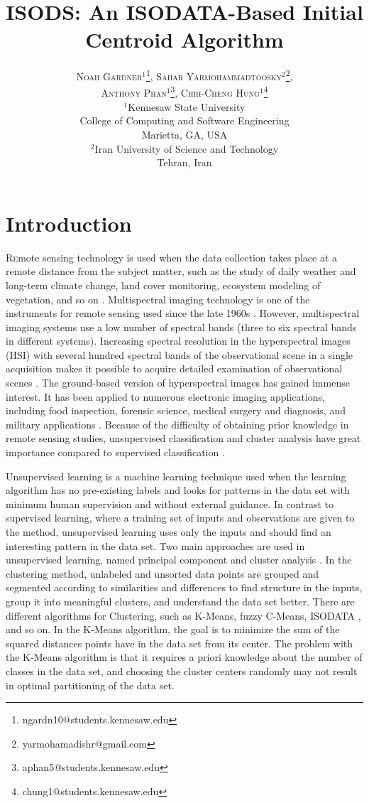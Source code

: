 \documentclass[twoside,twocolumn]{article}
\title{ISODS: An ISODATA-Based Initial Centroid Algorithm} %
\author{%
  \textsc{
    Noah Gardner$^1$\thanks{ngardn10@students.kennesaw.edu}, 
    Sahar Yarmohammadtoosky$^2$\thanks{yarmohamadishr@gmail.com},
    }\\[1ex]
  \textsc{
    Anthony Phan$^1$\thanks{aphan5@students.kennesaw.edu},
    Chih-Cheng Hung$^1$\thanks{chung1@students.kennesaw.edu}} \\[1ex]
  \normalsize $^1$Kennesaw State University \\
  \normalsize College of Computing and Software Engineering \\
  \normalsize Marietta, GA, USA \\[1ex]
  \normalsize $^2$Iran University of Science and Technology \\
  \normalsize Tehran, Iran
}
\date{} %
\begin{document}
\maketitle


\section{Introduction}

\lettrine[nindent=0em,lines=3]{R} emote sensing technology is used when the data
collection takes place at a remote distance from the subject matter, such as the
study of daily weather and long-term climate change, land cover monitoring,
ecosystem modeling of vegetation, and so on \cite{Jensen1996,Mallapragada2018}.
Multispectral imaging technology is one of the instruments for remote sensing
used since the late 1960s \cite{Khan2018,Landgrebe1999}. However, multispectral
imaging systems use a low number of spectral bands (three to six spectral bands
in different systems). Increasing spectral resolution in the hyperspectral
images (HSI) with several hundred spectral bands of the observational scene in a
single acquisition makes it possible to acquire detailed examination of
observational scenes \cite{Khan2018}. The ground-based version of hyperspectral
images has gained immense interest. It has been applied to numerous electronic
imaging applications, including food inspection, forensic science, medical
surgery and diagnosis, and military applications
\cite{Govender2009,Adam2009,Fischer2006,Carrasco2003}. Because of the difficulty
of obtaining prior knowledge in remote sensing studies, unsupervised
classification and cluster analysis have great importance compared to supervised
classification \cite{Abbas2016}.

Unsupervised learning is a machine learning technique used when the learning
algorithm has no pre-existing labels and looks for patterns in the data set with
minimum human supervision and without external guidance. In contrast to
supervised learning, where a training set of inputs and observations are given
to the method, unsupervised learning uses only the inputs and should find an
interesting pattern in the data set. Two main approaches are used in
unsupervised learning, named principal component \cite{Mallapragada2018} and
cluster analysis \cite{Xu2015}. In the clustering method, unlabeled and unsorted
data points are grouped and segmented according to similarities and differences
to find structure in the inputs, group it into meaningful clusters, and
understand the data set better. There are different algorithms for Clustering,
such as K-Means, fuzzy C-Means, ISODATA \cite{Ball1965}, and so on. In the
K-Means algorithm, the goal is to minimize the sum of the squared distances
points have in the data set from its center. The problem with the K-Means
algorithm is that it requires a priori knowledge about the number of classes in
the data set, and choosing the cluster centers randomly may not result in
optimal partitioning of the data set.
\end{document}
